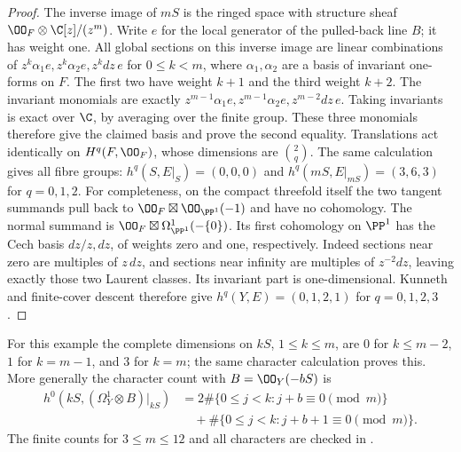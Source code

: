 \begin{proof}
The inverse image of $mS$ is the ringed space with structure sheaf $\OO_F\otimes\C[z]/(z^m)$. Write $e$ for the local generator of the pulled-back line $B$; it has weight one. All global sections on this inverse image are linear combinations of $z^k\alpha_1e,z^k\alpha_2e,z^kdz\,e$ for $0\le k<m$, where $\alpha_1,\alpha_2$ are a basis of invariant one-forms on $F$. The first two have weight $k+1$ and the third weight $k+2$. The invariant monomials are exactly
$z^{m-1}\alpha_1e,z^{m-1}\alpha_2e,z^{m-2}dz\,e$.
Taking invariants is exact over $\C$, by averaging over the finite group. These three monomials therefore give the claimed basis and prove the second equality. Translations act identically on $H^q(F,\OO_F)$, whose dimensions are $\binom{2}{q}$. The same calculation gives all fibre groups: $h^q(S,E|_S)=(0,0,0)$ and $h^q(mS,E|_{mS})=(3,6,3)$ for $q=0,1,2$. For completeness, on the compact threefold itself the two tangent summands pull back to $\OO_F\boxtimes\OO_{\PP^1}(-1)$ and have no cohomology. The normal summand is $\OO_F\boxtimes\Omega^1_{\PP^1}(-\{0\})$. Its first cohomology on $\PP^1$ has the Cech basis $dz/z,dz$, of weights zero and one, respectively. Indeed sections near zero are multiples of $z\,dz$, and sections near infinity are multiples of $z^{-2}dz$, leaving exactly those two Laurent classes. Its invariant part is one-dimensional. Kunneth and finite-cover descent therefore give $h^q(Y,E)=(0,1,2,1)$ for $q=0,1,2,3$.
\end{proof}

For this example the complete dimensions on $kS$, $1\le k\le m$, are $0$ for $k\le m-2$, $1$ for $k=m-1$, and $3$ for $k=m$; the same character calculation proves this. More generally the character count with $B=\OO_Y(-bS)$ is
\[
\begin{aligned}
h^0(kS,(\Omega_Y^1\otimes B)|_{kS})
&=2\#\{0\le j<k:j+b\equiv0\pmod m\}\\
&\quad+\#\{0\le j<k:j+b+1\equiv0\pmod m\}.
\end{aligned}
\tag{A.13}\label{cdp:eq:A.13}
\]
The finite counts for $3\le m\le12$ and all characters are checked in .


